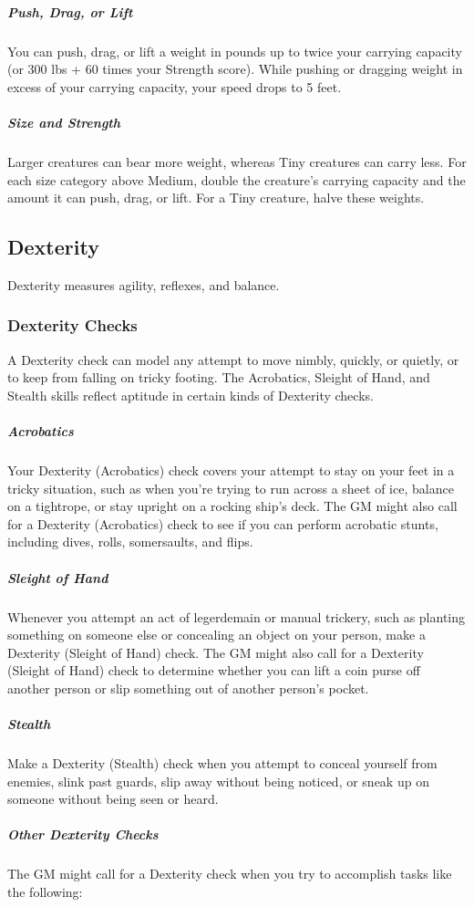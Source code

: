 \subparagraph*{Push, Drag, or Lift} You can push, drag, or lift a weight in pounds up to twice your carrying capacity (or 300 lbs + 60 times your Strength score). While pushing or dragging weight in excess of your carrying capacity, your speed drops to 5 feet.

\subparagraph*{Size and Strength} Larger creatures can bear more weight, whereas Tiny creatures can carry less. For each size category above Medium, double the creature's carrying capacity and the amount it can push, drag, or lift. For a Tiny creature, halve these weights.

\subsection{Dexterity}

Dexterity measures agility, reflexes, and balance.

\subsubsection{Dexterity Checks}

A Dexterity check can model any attempt to move nimbly, quickly, or quietly, or to keep from falling on tricky footing. The Acrobatics, Sleight of Hand, and Stealth skills reflect aptitude in certain kinds of Dexterity checks.

\subparagraph*{Acrobatics} Your Dexterity (Acrobatics) check covers your attempt to stay on your feet in a tricky situation, such as when you're trying to run across a sheet of ice, balance on a tightrope, or stay upright on a rocking ship's deck. The GM might also call for a Dexterity (Acrobatics) check to see if you can perform acrobatic stunts, including dives, rolls, somersaults, and flips.

\subparagraph*{Sleight of Hand} Whenever you attempt an act of legerdemain or manual trickery, such as planting something on someone else or concealing an object on your person, make a Dexterity (Sleight of Hand) check. The GM might also call for a Dexterity (Sleight of Hand) check to determine whether you can lift a coin purse off another person or slip something out of another person's pocket.

\subparagraph*{Stealth} Make a Dexterity (Stealth) check when you attempt to conceal yourself from enemies, slink past guards, slip away without being noticed, or sneak up on someone without being seen or heard.

\subparagraph*{Other Dexterity Checks} The GM might call for a Dexterity check when you try to accomplish tasks like the following:

